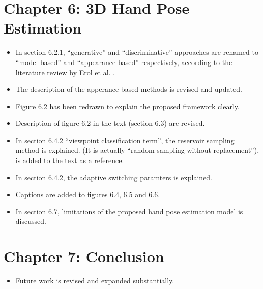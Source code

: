 \documentclass[10pt, a4paper]{article}
\begin{document}
\section{Chapter 6: 3D Hand Pose Estimation} 

\begin{itemize}
\item In section 6.2.1, ``generative'' and ``discriminative'' approaches are renamed to ``model-based'' and ``appearance-based'' respectively, according to the literature review by Erol et al. \cite{Erol2007}.
\item The description of the apperance-based methods is revised and updated.  
\item Figure 6.2 has been redrawn to explain the proposed framework clearly.
\item Description of figure 6.2 in the text (section 6.3) are revised.
\item In section 6.4.2 ``viewpoint classification term'', the reservoir sampling method is explained. (It is actually ``random sampling without replacement''), \cite{Vitter1985} is added to the text as a reference.
\item In section 6.4.2, the adaptive switching paramters is explained. 
\item Captions are added to figures 6.4, 6.5 and 6.6.
\item In section 6.7, limitations of the proposed hand pose estimation model is discussed.
\end{itemize}

\section{Chapter 7: Conclusion}
\begin{itemize}
\item Future work is revised and expanded substantially. 
\end{itemize}


 
\end{document}
